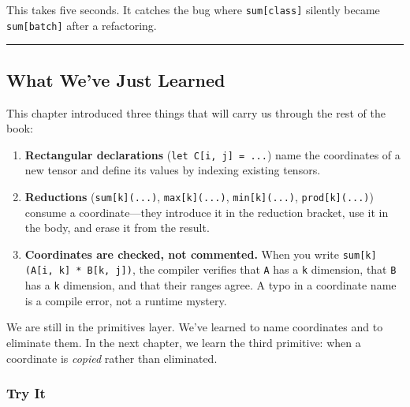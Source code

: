 \documentclass[11pt,]{article}
\providecommand{\tightlist}{%
  \setlength{\itemsep}{0pt}\setlength{\parskip}{0pt}}
\begin{document}
This takes five seconds. It catches the bug where
\texttt{sum{[}class{]}} silently became \texttt{sum{[}batch{]}} after a
refactoring.

\begin{center}\rule{0.5\linewidth}{0.4pt}\end{center}

\hypertarget{what-weve-just-learned}{%
\subsection{What We've Just Learned}\label{what-weve-just-learned}}

This chapter introduced three things that will carry us through the rest
of the book:

\begin{enumerate}
\def\labelenumi{\arabic{enumi}.}
\tightlist
\item
  \textbf{Rectangular declarations} (\texttt{let\ C{[}i,\ j{]}\ =\ ...})
  name the coordinates of a new tensor and define its values by indexing
  existing tensors.
\item
  \textbf{Reductions} (\texttt{sum{[}k{]}(...)},
  \texttt{max{[}k{]}(...)}, \texttt{min{[}k{]}(...)},
  \texttt{prod{[}k{]}(...)}) consume a coordinate---they introduce it in
  the reduction bracket, use it in the body, and erase it from the
  result.
\item
  \textbf{Coordinates are checked, not commented.} When you write
  \texttt{sum{[}k{]}(A{[}i,\ k{]}\ *\ B{[}k,\ j{]})}, the compiler
  verifies that \texttt{A} has a \texttt{k} dimension, that \texttt{B}
  has a \texttt{k} dimension, and that their ranges agree. A typo in a
  coordinate name is a compile error, not a runtime mystery.
\end{enumerate}

We are still in the primitives layer. We've learned to name coordinates
and to eliminate them. In the next chapter, we learn the third
primitive: when a coordinate is \emph{copied} rather than eliminated.

\hypertarget{try-it-2}{%
\subsubsection{Try It}\label{try-it-2}}
\end{document}
